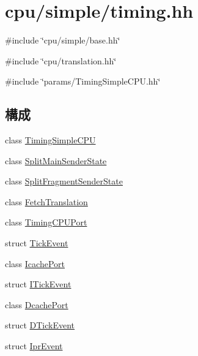 \hypertarget{timing_8hh}{
\section{cpu/simple/timing.hh}
\label{timing_8hh}
}
{\ttfamily \#include \char`\"{}cpu/simple/base.hh\char`\"{}}\par
{\ttfamily \#include \char`\"{}cpu/translation.hh\char`\"{}}\par
{\ttfamily \#include \char`\"{}params/TimingSimpleCPU.hh\char`\"{}}\par
\subsection*{構成}
\begin{DoxyCompactItemize}
\item 
class \hyperlink{classTimingSimpleCPU}{TimingSimpleCPU}
\item 
class \hyperlink{classTimingSimpleCPU_1_1SplitMainSenderState}{SplitMainSenderState}
\item 
class \hyperlink{classTimingSimpleCPU_1_1SplitFragmentSenderState}{SplitFragmentSenderState}
\item 
class \hyperlink{classTimingSimpleCPU_1_1FetchTranslation}{FetchTranslation}
\item 
class \hyperlink{classTimingSimpleCPU_1_1TimingCPUPort}{TimingCPUPort}
\item 
struct \hyperlink{structTimingSimpleCPU_1_1TimingCPUPort_1_1TickEvent}{TickEvent}
\item 
class \hyperlink{classTimingSimpleCPU_1_1IcachePort}{IcachePort}
\item 
struct \hyperlink{structTimingSimpleCPU_1_1IcachePort_1_1ITickEvent}{ITickEvent}
\item 
class \hyperlink{classTimingSimpleCPU_1_1DcachePort}{DcachePort}
\item 
struct \hyperlink{structTimingSimpleCPU_1_1DcachePort_1_1DTickEvent}{DTickEvent}
\item 
struct \hyperlink{structTimingSimpleCPU_1_1IprEvent}{IprEvent}
\end{DoxyCompactItemize}
